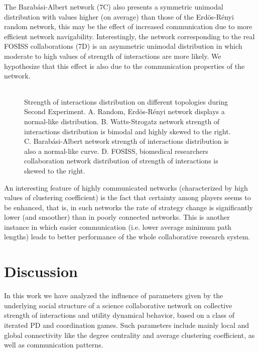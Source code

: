 \documentclass{bmcart}
\def\texttt{[image: ]}
\begin{document}
The Barab\'asi-Albert network (7C) also presents a symmetric unimodal
distribution with values higher (on average) than those of the
Erd\"{o}s-R\'enyi random network, this may be the effect of increased
communication due to more efficient network
navigability. Interestingly, the network corresponding to the real
FOSISS collaborations (7D) is an asymmetric unimodal distribution in
which moderate to high values of strength of interactions are more
likely. We hypothesize that this effect is also due to the
communication properties of the
network. \\

\begin{figure} [h!]
\centering
\begin{tabular}{cc}

\end{tabular}
\caption{Strength of interactions distribution on different topologies during Second Experiment. A. Random, Erd\"{o}s-R\'enyi network displays a normal-like
distribution. B. Watts-Strogatz network strength of interactions distribution is bimodal and highly skewed to the right. C.
Barab\'asi-Albert network strength of interactions distribution is also a
normal-like curve. D. FOSISS, biomedical researchers collaboration network distribution of strength of interactions is skewed to the right.}\label{histo_trust}  
\end{figure}


An interesting feature of highly communicated networks (characterized
by high values of clustering coefficient) is the fact that certainty
among players seems to be enhanced, that is, in such networks the rate
of strategy change is significantly lower (and smoother) than in
poorly connected networks. This is another instance in which easier
communication (i.e. lower average minimum path lengths) leads to better
performance of the whole collaborative research system.\\

\section*{Discussion}
\label{sec:3}

In this work we have analyzed the influence of parameters given by the
underlying social structure of a science collaborative network on collective
strength of interactions and utility dynamical behavior, based on a class of
iterated PD and coordination games. Such parameters include mainly local and
global connectivity like the degree centrality and average clustering
coefficient, as
well as communication patterns.\\
\end{document}

